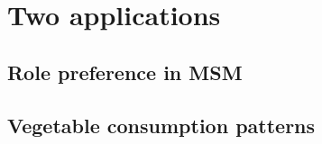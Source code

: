 \chapter{Two applications}
\label{cap:model}

\section{Role preference in MSM}
\label{sec:sexmsm}

\section{Vegetable consumption patterns}
\label{sec:veggies}